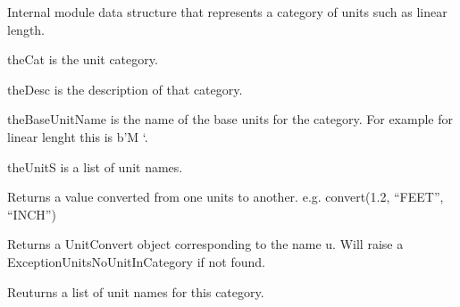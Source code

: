 \documentclass[letterpaper,10pt,english]{sphinxmanual}
\begin{document}

\begin{fulllineitems}
\label{\detokenize{ref/LIS/core/Units:TotalDepth.LIS.core.Units.UnitConvertCategory}}
Internal module data structure that represents a category of units such as linear length.

theCat is the unit category.

theDesc is the description of that category.

theBaseUnitName is the name of the base units for the category.
For example for linear lenght this is b’M   ‘.

theUnitS is a list of unit names.

\begin{fulllineitems}
\label{\detokenize{ref/LIS/core/Units:TotalDepth.LIS.core.Units.UnitConvertCategory.convert}}
Returns a value converted from one units to another.
e.g. convert(1.2, “FEET”, “INCH”)

\end{fulllineitems}


\begin{fulllineitems}
\label{\detokenize{ref/LIS/core/Units:TotalDepth.LIS.core.Units.UnitConvertCategory.unitConvertor}}
Returns a UnitConvert object corresponding to the name u.
Will raise a ExceptionUnitsNoUnitInCategory if not found.

\end{fulllineitems}


\begin{fulllineitems}
\label{\detokenize{ref/LIS/core/Units:TotalDepth.LIS.core.Units.UnitConvertCategory.units}}
Reuturns a list of unit names for this category.

\end{fulllineitems}


\end{fulllineitems}
\end{document}
